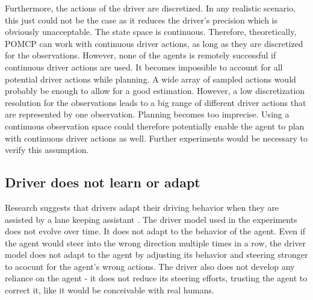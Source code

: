 Furthermore, the actions of the driver are discretized. In any realistic scenario, this just could not be the case as it reduces the driver's precision which is obviously unacceptable. The state space is continuous. Therefore, theoretically, POMCP can work with continuous driver actions, as long as they are discretized for the observations. However, none of the agents is remotely successful if continuous driver actions are used. It becomes impossible to account for all potential driver actions while planning. A wide array of sampled actions would probably be enough to allow for a good estimation. However, a low discretization resolution for the observations leads to a big range of different driver actions that are represented by one observation. Planning becomes too imprecise. Using a continuous observation space could therefore potentially enable the agent to plan with continuous driver actions as well. Further experiments would be necessary to verify this assumption.

\subsection{Driver does not learn or adapt}

Research suggests that drivers adapt their driving behavior when they are assisted by a lane keeping assistant \parencite{behavior_adapt}. The driver model used in the experiments does not evolve over time. It does not adapt to the behavior of the agent. Even if the agent would steer into the wrong direction multiple times in a row, the driver model does not adapt to the agent by adjusting its behavior and steering stronger to acocunt for the agent's wrong actions. The driver also does not develop any reliance on the agent - it does not reduce its steering efforts, trusting the agent to correct it, like it would be conceivable with real humans.



